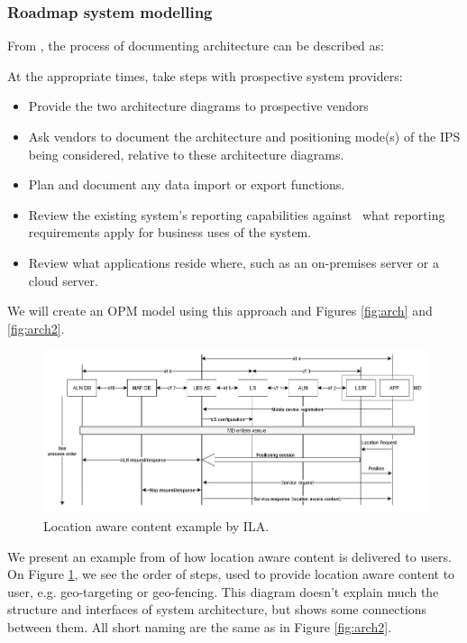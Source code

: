 \subsubsection{Roadmap system modelling}

From \cite{Security}, the process of documenting architecture can be described as:

At the appropriate times, take steps with prospective system providers:
\begin{itemize}[noitemsep]
\item Provide the two architecture diagrams to prospective vendors
\item Ask vendors to document the architecture and positioning mode(s) of the IPS being considered, relative to these architecture diagrams.
\item Plan and document any data import or export functions.
\item Review the existing system’s reporting capabilities against \ what reporting requirements apply for business uses of the system.
\item Review what applications reside where, such as an on-premises server or a cloud server.
\end{itemize}

We will create an OPM model using this approach and Figures \ref{fig:arch} and \ref{fig:arch2}.

\begin{figure}[h]
    \centering
    \includegraphics[width=\textwidth]{img/location aware content by ILA.png}
    \caption{Location aware content example by ILA.}
    \label{fig:loc_aware}
\end{figure}

We present an example from \cite{ILA-System-Architecture} of how location aware content is delivered to users.
On Figure \ref{fig:loc_aware}, we see the order of steps, used to provide location aware content to user, e.g. geo-targeting or geo-fencing. This diagram doesn't explain much the structure and interfaces of system architecture, but shows some connections between them. All short naming are the same as in Figure \ref{fig:arch2}.

